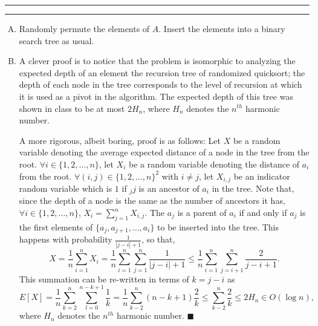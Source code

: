 \documentclass[11pt]{article}
\newcounter{questionCounter}
\newcounter{partCounter}[questionCounter]
\newenvironment{question}[2][\arabic{questionCounter}]{%
    \setcounter{partCounter}{0}%
    \vspace{.25in} \hrule \vspace{0.5em}%
        \noindent{\bf #2}%
    \vspace{0.8em} \hrule \vspace{.10in}%
    \addtocounter{questionCounter}{1}%
}{}
\begin{document}
\begin{question}{Problem 5: Vanilla search trees}
\begin{enumerate}[A.]
\item Randomly permute the elements of $A$. Insert the elements into a binary
search tree as usual.

\item A clever proof is to notice that the problem is isomorphic to analyzing
the expected depth of an element the recursion tree of randomized quicksort;
the depth of each node in the tree corresponds to the level of recursion at
which it is used as a pivot in the algorithm. The expected depth of this tree
was shown in class to be at most $2H_n$, where $H_n$ denotes the $n^{th}$
harmonic number.

A more rigorous, albeit boring, proof is as follows:
Let $X$ be a random variable denoting the average expected distance of a node
in the tree from the root.
$\forall i \in \{1,2,\ldots,n\}$, let $X_i$ be a random variable denoting the
distance of $a_i$ from the root.
$\forall (i,j) \in \{1,2,\ldots,n\}^2$ with $i \neq j$, let $X_{i,j}$ be an
indicator random variable which is $1$ if $_jj$ is an ancestor of $a_i$ in the
tree. Note that, since the depth of a node is the same as the number of
ancestors it has, $\forall i \in \{1,2,\ldots,n\}$,
$X_i = \sum_{j = 1}^n X_{i,j}$. The $a_j$ is a parent of $a_i$ if and only if
$a_j$ is the first elements of $\{a_j,a_{j + 1},\ldots,a_i\}$ to be inserted
into the tree. This happens with probability $\frac{1}{|j - i| + 1}$,
so that,
\[X = \frac{1}{n} \sum_{i = 1}^n X_i = \frac{1}{n} \sum_{i = 1}^n \sum_{j = 1}^n \frac{1}{|j - i| + 1}
\leq \frac{1}{n} \sum_{i = 1}^n \sum_{j = i + 1}^n \frac{2}{j - i + 1}.\]
This summation can be re-written in terms of $k = j - i$ as
\[E[X] = \frac{1}{n}\sum_{k = 2}^n \sum_{l = 0}^{n - k + 1} \frac{1}{k}
 = \frac{1}{n}\sum_{k - 2}^n (n - k + 1) \frac{2}{k} \leq \sum_{k - 2}^n \frac{2}{k}
 \leq 2H_n \in O(\log n),\]
where $H_n$ denotes the $n^{th}$ harmonic number. \qquad $\blacksquare$
\end{enumerate}
\end{question}
\end{document}
